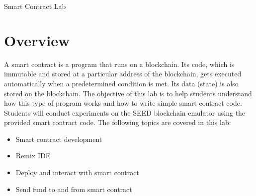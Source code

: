 
\newcommand{\commonfolder}{../../common-files}










\begin{center}
{\LARGE Smart Contract Lab}
\end{center}


\newcommand{\contractfolder}{{\path{Labsetup/contract}}\xspace}

\section{Overview}

A smart contract is a program that runs on a
blockchain. Its code, which is immutable and 
stored at a particular address of the blockchain, 
gets executed automatically
when a predetermined condition is met. 
Its data (state) is also stored on the blockchain. 
The objective of this lab is to help students understand how 
this type of program works and how to write 
simple smart contract code. 
Students will conduct experiments on the 
SEED blockchain emulator using the 
provided smart contract code.
The following topics are covered in this lab: 

\begin{itemize}[noitemsep]
\item Smart contract development 
\item Remix IDE
\item Deploy and interact with smart contract
\item Send fund to and from smart contract
\end{itemize}
 

